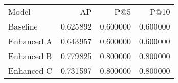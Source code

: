 \begin{tabular}{lrrr}
Model & AP & P@5 & P@10 \\
Baseline & 0.625892 & 0.600000 & 0.600000 \\
Enhanced A & 0.643957 & 0.600000 & 0.600000 \\
Enhanced B & 0.779825 & 0.800000 & 0.800000 \\
Enhanced C & 0.731597 & 0.800000 & 0.800000 \\
\end{tabular}
